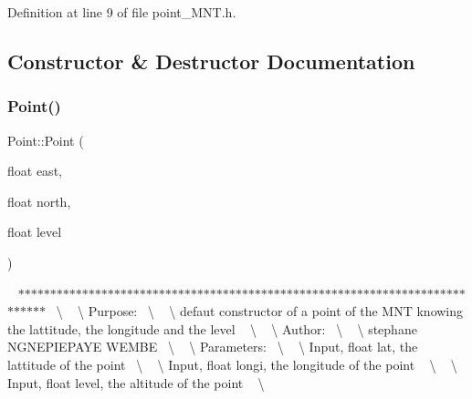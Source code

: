 Definition at line 9 of file point\+\_\+\+M\+N\+T.\+h.



\subsection{Constructor \& Destructor Documentation}
\mbox{\label{class_point_a11e86874da3294d7ea8b35be9cd5bd9c}} 
\subsubsection{\texorpdfstring{Point()}{Point()}}
{\footnotesize\ttfamily Point\+::\+Point (\begin{DoxyParamCaption}\item[{float}]{east,  }\item[{float}]{north,  }\item[{float}]{level }\end{DoxyParamCaption})}

~\newline
$\ast$$\ast$$\ast$$\ast$$\ast$$\ast$$\ast$$\ast$$\ast$$\ast$$\ast$$\ast$$\ast$$\ast$$\ast$$\ast$$\ast$$\ast$$\ast$$\ast$$\ast$$\ast$$\ast$$\ast$$\ast$$\ast$$\ast$$\ast$$\ast$$\ast$$\ast$$\ast$$\ast$$\ast$$\ast$$\ast$$\ast$$\ast$$\ast$$\ast$$\ast$$\ast$$\ast$$\ast$$\ast$$\ast$$\ast$$\ast$$\ast$$\ast$$\ast$$\ast$$\ast$$\ast$$\ast$$\ast$$\ast$$\ast$$\ast$$\ast$$\ast$$\ast$$\ast$$\ast$$\ast$$\ast$$\ast$$\ast$$\ast$$\ast$$\ast$$\ast$$\ast$$\ast$$\ast$$\ast$~\newline
\textbackslash{} ~\newline
\textbackslash{} Purpose\+:~\newline
\textbackslash{} ~\newline
\textbackslash{} defaut constructor of a point of the M\+NT knowing the lattitude, the longitude and the level ~\newline
\textbackslash{} ~\newline
\textbackslash{} Author\+:~\newline
\textbackslash{} ~\newline
\textbackslash{} stephane N\+G\+N\+E\+P\+I\+E\+P\+A\+YE W\+E\+M\+BE~\newline
\textbackslash{} ~\newline
\textbackslash{} Parameters\+:~\newline
\textbackslash{} ~\newline
\textbackslash{} Input, float lat, the lattitude of the point~\newline
\textbackslash{} ~\newline
\textbackslash{} Input, float longi, the longitude of the point ~\newline
\textbackslash{} ~\newline
\textbackslash{} Input, float level, the altitude of the point ~\newline
\textbackslash{} ~\newline
 

